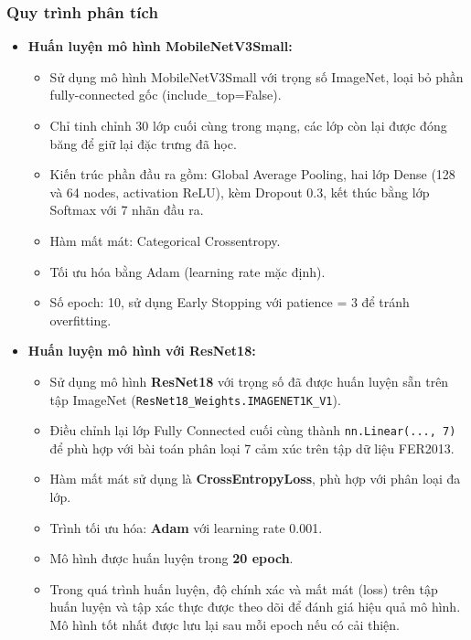 \subsubsection{Quy trình phân tích}
\begin{itemize}
    \item \textbf{Huấn luyện mô hình MobileNetV3Small:}
    \begin{itemize}
        \item Sử dụng mô hình MobileNetV3Small với trọng số ImageNet, loại bỏ phần fully-connected gốc (include\_top=False).
        \item Chỉ tinh chỉnh 30 lớp cuối cùng trong mạng, các lớp còn lại được đóng băng để giữ lại đặc trưng đã học.
        \item Kiến trúc phần đầu ra gồm: Global Average Pooling, hai lớp Dense (128 và 64 nodes, activation ReLU), kèm Dropout 0.3, kết thúc bằng lớp Softmax với 7 nhãn đầu ra.
        \item Hàm mất mát: Categorical Crossentropy.
        \item Tối ưu hóa bằng Adam (learning rate mặc định).
        \item Số epoch: 10, sử dụng Early Stopping với patience = 3 để tránh overfitting.
    \end{itemize}

    \item \textbf{Huấn luyện mô hình với ResNet18:}
    \begin{itemize}
        \item Sử dụng mô hình \textbf{ResNet18} với trọng số đã được huấn luyện sẵn trên tập ImageNet (\texttt{ResNet18\_Weights.IMAGENET1K\_V1}).
        \item Điều chỉnh lại lớp Fully Connected cuối cùng thành \texttt{nn.Linear(..., 7)} để phù hợp với bài toán phân loại 7 cảm xúc trên tập dữ liệu FER2013.
        \item Hàm mất mát sử dụng là \textbf{CrossEntropyLoss}, phù hợp với phân loại đa lớp.
        \item Trình tối ưu hóa: \textbf{Adam} với learning rate 0.001.
        \item Mô hình được huấn luyện trong \textbf{20 epoch}.
        \item Trong quá trình huấn luyện, độ chính xác và mất mát (loss) trên tập huấn luyện và tập xác thực được theo dõi để đánh giá hiệu quả mô hình. Mô hình tốt nhất được lưu lại sau mỗi epoch nếu có cải thiện.
    \end{itemize}


\end{itemize}

